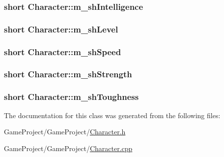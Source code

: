 \hypertarget{class_character_a2319f838d38029537e1e5c6e24c24ebb}{
\subsubsection[{m\-\_\-sh\-Intelligence}]{\setlength{\rightskip}{0pt plus 5cm}short Character\-::m\-\_\-sh\-Intelligence\hspace{0.3cm}{\ttfamily [private]}}}\label{class_character_a2319f838d38029537e1e5c6e24c24ebb}
\hypertarget{class_character_afd011d8f32a2f60e3ef604a191d3ebf4}{
\subsubsection[{m\-\_\-sh\-Level}]{\setlength{\rightskip}{0pt plus 5cm}short Character\-::m\-\_\-sh\-Level\hspace{0.3cm}{\ttfamily [private]}}}\label{class_character_afd011d8f32a2f60e3ef604a191d3ebf4}
\hypertarget{class_character_abb0c7e556292b3d93d52e9c9f9db6258}{
\subsubsection[{m\-\_\-sh\-Speed}]{\setlength{\rightskip}{0pt plus 5cm}short Character\-::m\-\_\-sh\-Speed\hspace{0.3cm}{\ttfamily [private]}}}\label{class_character_abb0c7e556292b3d93d52e9c9f9db6258}
\hypertarget{class_character_a500cced8623c4cca096e0555795b6025}{
\subsubsection[{m\-\_\-sh\-Strength}]{\setlength{\rightskip}{0pt plus 5cm}short Character\-::m\-\_\-sh\-Strength\hspace{0.3cm}{\ttfamily [private]}}}\label{class_character_a500cced8623c4cca096e0555795b6025}
\hypertarget{class_character_adaaccd5040167071f5aa3281cade4c19}{
\subsubsection[{m\-\_\-sh\-Toughness}]{\setlength{\rightskip}{0pt plus 5cm}short Character\-::m\-\_\-sh\-Toughness\hspace{0.3cm}{\ttfamily [private]}}}\label{class_character_adaaccd5040167071f5aa3281cade4c19}


The documentation for this class was generated from the following files\-:\begin{DoxyCompactItemize}
\item 
Game\-Project/\-Game\-Project/\hyperlink{_character_8h}{Character.\-h}\item 
Game\-Project/\-Game\-Project/\hyperlink{_character_8cpp}{Character.\-cpp}\end{DoxyCompactItemize}
